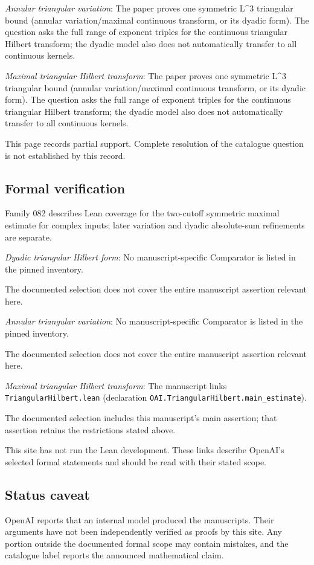 \documentclass[11pt]{article}
\begin{document}
\textit{Annular triangular variation}: The paper proves one symmetric L\textasciicircum{}3 triangular bound (annular variation/maximal continuous transform, or its dyadic form). The question asks the full range of exponent triples for the continuous triangular Hilbert transform; the dyadic model also does not automatically transfer to all continuous kernels.

\textit{Maximal triangular Hilbert transform}: The paper proves one symmetric L\textasciicircum{}3 triangular bound (annular variation/maximal continuous transform, or its dyadic form). The question asks the full range of exponent triples for the continuous triangular Hilbert transform; the dyadic model also does not automatically transfer to all continuous kernels.

This page records partial support. Complete resolution of the catalogue question is not established by this record.

\subsection{Formal verification}
Family 082 describes Lean coverage for the two-cutoff symmetric maximal estimate for complex inputs; later variation and dyadic absolute-sum refinements are separate.

\textit{Dyadic triangular Hilbert form}: No manuscript-specific Comparator is listed in the pinned inventory.

The documented selection does not cover the entire manuscript assertion relevant here.

\textit{Annular triangular variation}: No manuscript-specific Comparator is listed in the pinned inventory.

The documented selection does not cover the entire manuscript assertion relevant here.

\textit{Maximal triangular Hilbert transform}: The manuscript links \texttt{TriangularHilbert.lean} (declaration \texttt{OAI.TriangularHilbert.main\_estimate}).

The documented selection includes this manuscript’s main assertion; that assertion retains the restrictions stated above.

This site has not run the Lean development. These links describe OpenAI’s selected formal statements and should be read with their stated scope.

\subsection{Status caveat}
OpenAI reports that an internal model produced the manuscripts. Their arguments have not been independently verified as proofs by this site. Any portion outside the documented formal scope may contain mistakes, and the catalogue label reports the announced mathematical claim.
\end{document}
